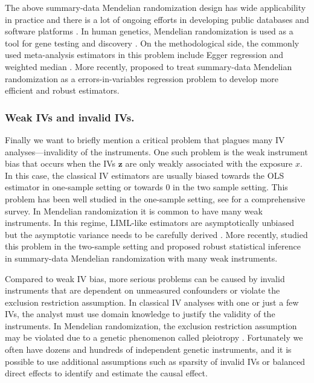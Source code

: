 \documentclass[preprint]{imsart}
\begin{document}
The above summary-data Mendelian randomization design has wide
applicability in practice \citep{burgess2015using} and there is a lot
of ongoing efforts in developing public databases and software
platforms \citep{hemani2018mr}. In human genetics, Mendelian
randomization is used as a tool for gene testing and discovery
\citep{gamazon2015gene}. On the methodological side, the
commonly used meta-analysis estimators in this problem include Egger
regression \citep{bowden2015mendelian} and weighted median
\citep{bowden2016consistent}. More recently,
\citet{zhao2018statistical} proposed to treat summary-data Mendelian
randomization as a errors-in-variables regression problem to develop
more efficient and robust estimators.

\subsubsection{Weak IVs and invalid IVs.}
\label{sec:weak-instruments}

Finally we want to briefly mention a critical problem that plagues
many IV analyses---invalidity of the
instruments. One such problem is the weak instrument bias that occurs
when the IVs $\bm z$ are only weakly associated with the exposure
$x$. In this case, the classical IV estimators are usually biased
towards the OLS estimator in one-sample setting or towards 0 in the
two sample setting. This problem has been well studied in the
one-sample setting, see \citet{stock2002survey} for a comprehensive
survey. In Mendelian randomization it is common to have many weak
instruments. In this regime, LIML-like estimators are asymptotically
unbiased but the asymptotic variance needs to be carefully derived
\citep{hansen2008estimation}. More recently, \citet{choi2018weak}
studied this problem in the two-sample setting and
\citet{zhao2018statistical} proposed robust statistical inference in
summary-data Mendelian randomization with many weak instruments.

Compared to weak IV bias, more serious problems can be caused by invalid
instruments that are dependent on unmeasured confounders or violate
the exclusion restriction assumption. In classical IV analyses with
one or just a few IVs, the analyst must use domain knowledge to
justify the validity of the instruments. In Mendelian randomization,
the exclusion restriction assumption may be violated due to a
genetic phenomenon called pleiotropy
\citep{davey2003mendelian}. Fortunately we often have dozens and
hundreds of independent genetic instruments, and it is possible to use additional
assumptions such as sparsity of invalid IVs
\citep{kang2016instrumental} or balanced direct effects
\citep{bowden2015mendelian} to identify and estimate the causal
effect.
\end{document}
